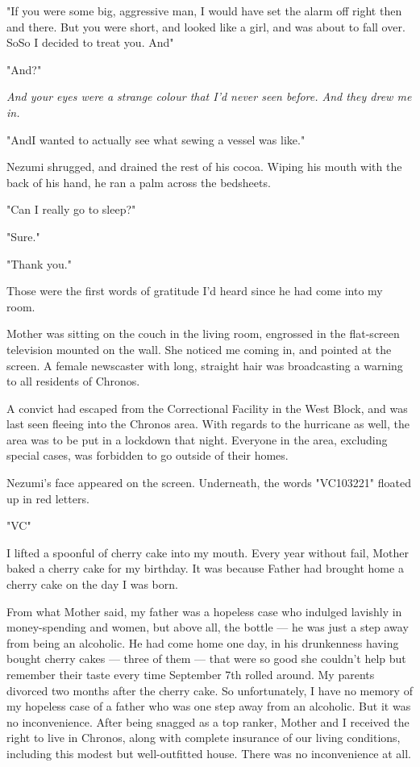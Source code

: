 "If you were some big, aggressive man, I would have set the alarm off
right then and there. But you were short, and looked like a girl, and
was about to fall over. So\el So I decided to treat you. And\el "

"And?"

\emph{And your eyes were a strange colour that I'd never seen before. And they
drew me in.}

"And\el I wanted to actually see what sewing a vessel was like."

Nezumi shrugged, and drained the rest of his cocoa. Wiping his mouth
with the back of his hand, he ran a palm across the bedsheets.

"Can I really go to sleep?"

"Sure."

"Thank you."

Those were the first words of gratitude I'd heard since he had come into
my room.

\mybreak

Mother was sitting on the couch in the living room, engrossed in the
flat-screen television mounted on the wall. She noticed me coming in,
and pointed at the screen. A female newscaster with long, straight hair
was broadcasting a warning to all residents of Chronos.

A convict had escaped from the Correctional Facility in the West Block,
and was last seen fleeing into the Chronos area. With regards to the
hurricane as well, the area was to be put in a lockdown that night.
Everyone in the area, excluding special cases, was forbidden to go
outside of their homes.

\myspace

Nezumi's face appeared on the screen. Underneath, the words "VC103221"
floated up in red letters.

"VC\el "

I lifted a spoonful of cherry cake into my mouth. Every year without
fail, Mother baked a cherry cake for my birthday. It was because Father
had brought home a cherry cake on the day I was born.

From what Mother said, my father was a hopeless case who indulged
lavishly in money-spending and women, but above all, the bottle --- he was
just a step away from being an alcoholic. He had come home one day, in
his drunkenness having bought cherry cakes --- three of them --- that were
so good she couldn't help but remember their taste every time September
7th rolled around. My parents divorced two months after the cherry cake.
So unfortunately, I have no memory of my hopeless case of a father who
was one step away from an alcoholic. But it was no inconvenience. After
being snagged as a top ranker, Mother and I received the right to live
in Chronos, along with complete insurance of our living conditions,
including this modest but well-outfitted house. There was no
inconvenience at all.

